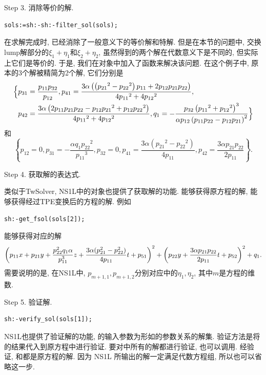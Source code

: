Step 3. 消除等价的解.
\begin{verbatim}
sols:=sh:-sh:-filter_sol(sols);
\end{verbatim}
在求解完成时, 已经消除了一般意义下的等价解和特解. 但是在本节的问题中, 交换lump解部分的$\xi_1+\eta_1$和$\xi_2+\eta_2$, 虽然得到的两个解在代数意义下是不同的, 但实际上它们是等价的. 于是, 我们在对象中加入了函数来解决该问题. 在这个例子中, 原本的3个解被精简为2个解, 它们分别是
\begin{equation}
\begin{split}
\Bigl\{ 
& p_{{31}}={\frac {p_{{11}}p_{{32}}}{p_{{12}}}}, 
p_{{41}}={\frac {3\alpha \left(  \left( {p_{{21}}}^{2}-{p_{{22}}}^{2} \right) p_{{11}}+2p_{{12}}p_{{21}}p_{{22}} \right) }{4{p_{{11}}}^{2}+4{p_{{12}}}^{2}}}, \\
& p_{{42}}={\frac {3\alpha \left( 2p_{{11}}p_{{21}}p_{{22}}-p_{{12}}{p_{{21}}}^{2}+p_{{12}}{p_{{22}}}^{2}\right) }{4{p_{{11}}}^{2}+4{p_{{12}}}^{2}}}, 
q_{{1}}=-{\frac {p_{{32}} \left( {p_{{11}}}^{2}+{p_{{12}}}^{2} \right) ^{3}}{\alpha p_{{12}} \left( p_{{11}}p_{{22}}-p_{{12}}p_{{21}} \right) ^{2}}} 
 \Bigr\} 
\end{split}
\label{0S1L-1}
\end{equation}
和
\begin{equation}
 \left\{ p_{{12}}=0,p_{{31}}=-{\frac {\alpha q_{{1}}{p_{{22}}}^{2}
}{{p_{{11}}}^{3}}},p_{{32}}=0,p_{{41}}={\frac {3\alpha
 \left( {p_{{21}}}^{2}-{p_{{22}}}^{2} \right) }{4p_{{11}}}},p_{{42}
}={\frac {3\alpha p_{{21}}p_{{22}}}{2p_{{11}}}} \right\} . \label{0S1L-2}
\end{equation}

Step 4. 获取解的表达式.

类似于TwSolver, NS1L中的对象也提供了获取解的功能. 能够获得原方程的解, 能够获得经过TPE变换后的方程的解. 例如
\begin{verbatim}
sh:-get_fsol(sols[2]);
\end{verbatim}
能够获得对应的解 
\begin{equation}
\left(p_{11}x+p_{21}y+\frac{p_{22}^2q_1\alpha}{p_{11}^3}z+\frac{3\alpha (p_{21}^2-p_{22}^2)}{4p_{11}}t+p_{51}\right)^2
+\left(p_{22}y+\frac{3\alpha p_{21}p_{22}}{2p_{11}}t+p_{52}\right)^2+q_1 .
\end{equation}
需要说明的是, 在NS1L中, $p_{m+1,1},p_{m+1,2}$分别对应中的$\eta_1,\eta_2$, 其中$m$是方程的维数. 

Step 5. 验证解.
\begin{verbatim}
sh:-verify_sol(sols[1]);
\end{verbatim}
NS1L也提供了验证解的功能, 的输入参数为形如的参数关系的解集. 验证方法是将的结果代入到原方程中进行验证. 要对中所有的解都进行验证, 也可以调用. 经验证, 和都是原方程的解. 因为 NS1L 所输出的解一定满足代数方程组, 所以也可以省略这一步.

